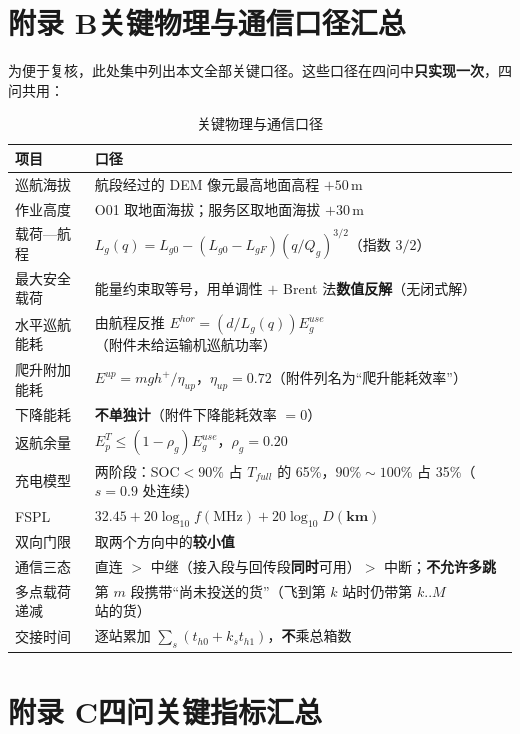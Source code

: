 \section*{附录 B\quad 关键物理与通信口径汇总}

为便于复核，此处集中列出本文全部关键口径。这些口径在四问中\textbf{只实现一次}，四问共用：

\begin{table}[htbp]
	\caption{关键物理与通信口径}
	\centering
	\begin{tabularx}{0.94\textwidth}{lX}
		\toprule
		项目 & 口径 \\
		\midrule
		巡航海拔 & 航段经过的 DEM 像元最高地面高程 $+50$\,m \\
		作业高度 & O01 取地面海拔；服务区取地面海拔 $+30$\,m \\
		载荷—航程 & $L_{g}(q)=L_{g0}-(L_{g0}-L_{gF})(q/Q_{g})^{3/2}$（指数 $3/2$） \\
		最大安全载荷 & 能量约束取等号，用单调性 $+$ Brent 法\textbf{数值反解}（无闭式解） \\
		水平巡航能耗 & 由航程反推 $E^{hor}=(d/L_{g}(q))E_{g}^{use}$（附件未给运输机巡航功率） \\
		爬升附加能耗 & $E^{up}=mgh^{+}/\eta_{up}$，$\eta_{up}=0.72$（附件列名为“爬升能耗效率”） \\
		下降能耗 & \textbf{不单独计}（附件下降能耗效率 $=0$） \\
		返航余量 & $E_{p}^{T}\le(1-\rho_{g})E_{g}^{use}$，$\rho_{g}=0.20$ \\
		充电模型 & 两阶段：SOC$<90\%$ 占 $T_{full}$ 的 65\%，$90\%\sim100\%$ 占 35\%（$s=0.9$ 处连续） \\
		FSPL & $32.45+20\log_{10}f(\mathrm{MHz})+20\log_{10}D(\mathbf{km})$ \\
		双向门限 & 取两个方向中的\textbf{较小值} \\
		通信三态 & 直连 $>$ 中继（接入段与回传段\textbf{同时}可用）$>$ 中断；\textbf{不允许多跳} \\
		多点载荷递减 & 第 $m$ 段携带“尚未投送的货”（飞到第 $k$ 站时仍带第 $k..M$ 站的货） \\
		交接时间 & 逐站累加 $\sum_{s}(t_{h0}+k_{s}t_{h1})$，\textbf{不}乘总箱数 \\
		\bottomrule
	\end{tabularx}
\end{table}

\section*{附录 C\quad 四问关键指标汇总}

